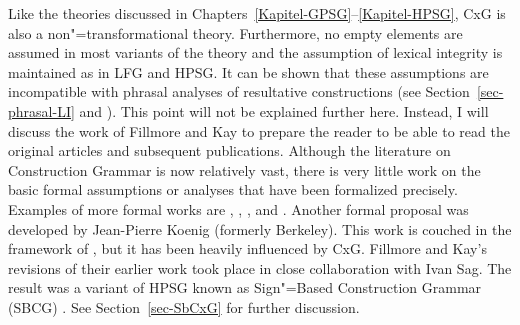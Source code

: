 \addlines
Like the theories discussed in Chapters~\ref{Kapitel-GPSG}--\ref{Kapitel-HPSG}, CxG is also a non"=transformational theory.
Furthermore, no empty elements are assumed in most variants of the theory and the assumption of lexical integrity is maintained
 as in LFG and HPSG. 
It can be shown that these assumptions are incompatible with phrasal analyses of resultative constructions (see
Section~\ref{sec-phrasal-LI} and \citealp{Mueller2006d,Mueller2007d}). This point will not be explained further here. Instead, I will discuss the work of Fillmore and Kay to prepare the reader
to be able to read the original articles and subsequent publications. Although the literature on Construction Grammar is now relatively vast, there is very
little work on the basic formal assumptions or analyses that have been formalized precisely.
Examples of more formal works are , \citet{Kay2002a}, , and
. Another formal proposal was developed by Jean-Pierre Koenig
\citeyearpar{Koenig99a} (formerly Berkeley). This work is couched in the framework of \hpsg, but it has been heavily influenced by CxG. Fillmore and Kay's revisions of their earlier work
took place in close collaboration with Ivan Sag. The result was a variant of HPSG known as Sign"=Based Construction Grammar (SBCG) \citep{Sag2010b,Sag2012a}.
See Section~\ref{sec-SbCxG} for further discussion.

